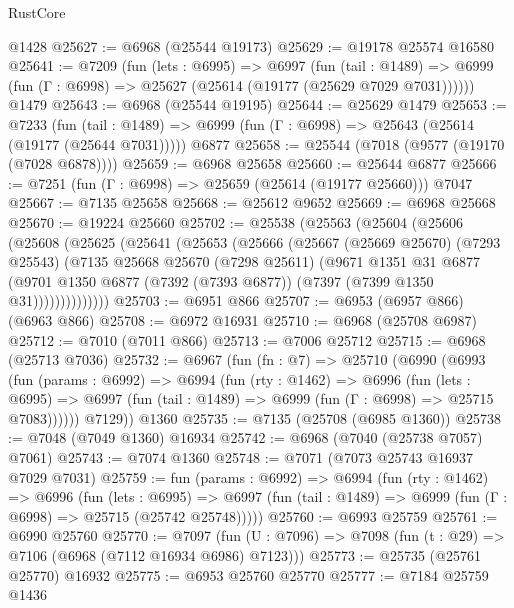 \begin{lexlean}{RustCore}
\begin{coremodule}
    @1428
@25627 := @6968 (@25544 @19173)
@25629 := @19178 @25574 @16580
@25641 := @7209
    (fun (lets : @6995) =>
    @6997
      (fun (tail : @1489) =>
      @6999 (fun (Γ : @6998) => @25627 (@25614 (@19177 (@25629 @7029 @7031))))))
    @1479
@25643 := @6968 (@25544 @19195)
@25644 := @25629 @1479
@25653 := @7233
    (fun (tail : @1489) => @6999 (fun (Γ : @6998) => @25643 (@25614 (@19177 (@25644 @7031)))))
    @6877
@25658 := @25544 (@7018 (@9577 (@19170 (@7028 @6878))))
@25659 := @6968 @25658
@25660 := @25644 @6877
@25666 := @7251 (fun (Γ : @6998) => @25659 (@25614 (@19177 @25660))) @7047
@25667 := @7135 @25658
@25668 := @25612 @9652
@25669 := @6968 @25668
@25670 := @19224 @25660
@25702 := @25538
    (@25563
      (@25604
        (@25606
          (@25608
            (@25625
              (@25641
                (@25653
                  (@25666
                    (@25667
                      (@25669 @25670)
                      (@7293 @25543)
                      (@7135
                        @25668
                        @25670
                        (@7298 @25611)
                        (@9671
                          @1351
                          @31
                          @6877
                          (@9701
                            @1350
                            @6877
                            (@7392 (@7393 @6877))
                            (@7397 (@7399 @1350 @31))))))))))))))
@25703 := @6951 @866
@25707 := @6953 (@6957 @866) (@6963 @866)
@25708 := @6972 @16931
@25710 := @6968 (@25708 @6987)
@25712 := @7010 (@7011 @866)
@25713 := @7006 @25712
@25715 := @6968 (@25713 @7036)
@25732 := @6967
    (fun (fn : @7) =>
    @25710
      (@6990
        (@6993
          (fun (params : @6992) =>
          @6994
            (fun (rty : @1462) =>
            @6996
              (fun (lets : @6995) =>
              @6997 (fun (tail : @1489) => @6999 (fun (Γ : @6998) => @25715 @7083))))))
        @7129))
    @1360
@25735 := @7135 (@25708 (@6985 @1360))
@25738 := @7048 (@7049 @1360) @16934
@25742 := @6968 (@7040 (@25738 @7057) @7061)
@25743 := @7074 @1360
@25748 := @7071 (@7073 @25743 @16937 @7029 @7031)
@25759 := fun (params : @6992) =>
  @6994
    (fun (rty : @1462) =>
    @6996
      (fun (lets : @6995) =>
      @6997 (fun (tail : @1489) => @6999 (fun (Γ : @6998) => @25715 (@25742 @25748)))))
@25760 := @6993 @25759
@25761 := @6990 @25760
@25770 := @7097
    (fun (U : @7096) => @7098 (fun (t : @29) => @7106 (@6968 (@7112 @16934 @6986) @7123)))
@25773 := @25735 (@25761 @25770) @16932
@25775 := @6953 @25760 @25770
@25777 := @7184 @25759 @1436

\end{coremodule}
\end{lexlean}
